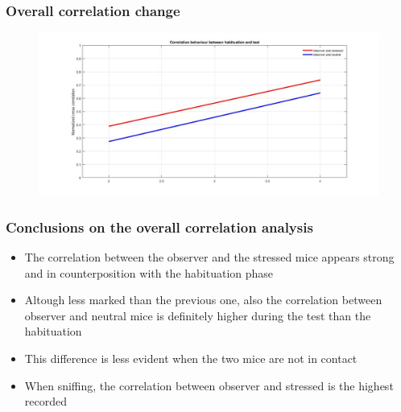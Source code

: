 \documentclass{beamer}
\begin{document}
\begin{frame}
\frametitle{Overall correlation change}



\begin{figure}[H]
	\begin{center}
		\hspace*{-1cm}
		\includegraphics[scale=.30]{corr_line.jpg} 
	\end{center}  
	
	
\end{figure}

\end{frame}

\begin{frame}
\frametitle{Conclusions on the overall correlation analysis}



\begin{itemize}
	
	\item The correlation between the observer and the stressed mice appears strong and in counterposition with the habituation phase
	
	\item Altough less marked than the previous one, also the correlation between observer and neutral mice is definitely higher during the test than the habituation
	
	\item This difference is less evident when the two mice are not in contact
	
	\item When sniffing, the correlation between observer and stressed is the highest recorded
	
	
	
\end{itemize}

\end{frame}	
\end{document}
